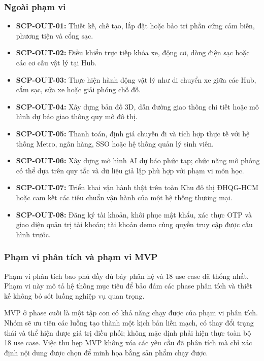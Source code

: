 \subsubsection*{Ngoài phạm vi}

\begin{itemize}
  \item \textbf{SCP-OUT-01:} Thiết kế, chế tạo, lắp đặt hoặc bảo trì phần cứng cảm biến, phương tiện và cổng sạc.
  \item \textbf{SCP-OUT-02:} Điều khiển trực tiếp khóa xe, động cơ, dòng điện sạc hoặc các cơ cấu vật lý tại Hub.
  \item \textbf{SCP-OUT-03:} Thực hiện hành động vật lý như di chuyển xe giữa các Hub, cắm sạc, sửa xe hoặc giải phóng chỗ đỗ.
  \item \textbf{SCP-OUT-04:} Xây dựng bản đồ 3D, dẫn đường giao thông chi tiết hoặc mô hình dự báo giao thông quy mô đô thị.
  \item \textbf{SCP-OUT-05:} Thanh toán, định giá chuyến đi và tích hợp thực tế với hệ thống Metro, ngân hàng, SSO hoặc hệ thống quản lý sinh viên.
  \item \textbf{SCP-OUT-06:} Xây dựng mô hình AI dự báo phức tạp; chức năng mô phỏng có thể dựa trên quy tắc và dữ liệu giả lập phù hợp với phạm vi môn học.
  \item \textbf{SCP-OUT-07:} Triển khai vận hành thật trên toàn Khu đô thị ĐHQG-HCM hoặc cam kết các tiêu chuẩn vận hành của một hệ thống thương mại.
  \item \textbf{SCP-OUT-08:} Đăng ký tài khoản, khôi phục mật khẩu, xác thực OTP và giao diện quản trị tài khoản; tài khoản demo cùng quyền truy cập được cấu hình trước.
\end{itemize}

\subsubsection*{Phạm vi phân tích và phạm vi MVP}

Phạm vi phân tích bao phủ đầy đủ bảy phân hệ và 18 use case đã thống nhất. Phạm vi này mô tả hệ thống mục tiêu để bảo đảm các phase phân tích và thiết kế không bỏ sót luồng nghiệp vụ quan trọng.

MVP ở phase cuối là một tập con có khả năng chạy được của phạm vi phân tích. Nhóm sẽ ưu tiên các luồng tạo thành một kịch bản liền mạch, có thay đổi trạng thái và thể hiện được giá trị điều phối; không mặc định phải hiện thực toàn bộ 18 use case. Việc thu hẹp MVP không xóa các yêu cầu đã phân tích mà chỉ xác định nội dung được chọn để minh họa bằng sản phẩm chạy được.

